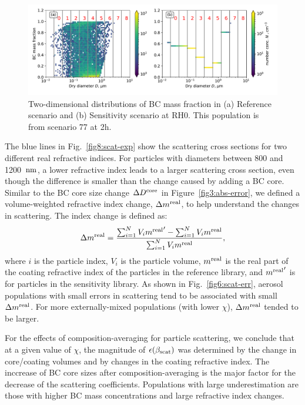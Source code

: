 \documentclass[edeposit,fullpage]{uiucthesis2009}
\makeatletter
\DeclareRobustCommand*\unit[1]
 {\ensuremath{%
   {\thinmuskip3mu\relax
    \def\mu{\text{\textmu}}\def~{\,}%
    \ifx\f@series\testbx\mathbf{#1}\else\mathrm{#1}\fi}}}
\makeatother
\begin{document}
\begin{figure}[H]
	\centering
	\includegraphics[scale=0.50]{chap4_figs/fig_sup3.pdf}
	\caption{Two-dimensional distributions of BC mass fraction in (a) Reference scenario and (b) Sensitivity scenario at RH0. 
	 This population is from scenario 77 at 2h.}
	\label{fig_sup3}
\end{figure}

The blue lines in Fig.~\ref{fig8:scat-exp} show the scattering cross
sections for two different real refractive indices. For particles with
diameters between 800 and 1200~\unit{nm}, a lower refractive index
leads to a larger scattering cross section, even though the difference
is smaller than the change caused by adding a BC core. Similar to the
BC core size change $\Delta D^{\rm core}$ {in
  Figure~\ref{fig3:abs-error}}, we defined a volume-weighted
refractive index change, $\Delta{m^{\rm real}}$, to help understand
the changes in scattering. The index change is defined as:
\begin{equation}
    \displaystyle \Delta{m^{\rm real}}=\frac{\sum_{i=1}^{N} V_i {m^{\rm real}}' - \sum_{i=1}^{N} V_i {m^{\rm real}}}{\sum_{i=1}^{N} V_i {m^{\rm real}}},
\end{equation}
where $i$ is the particle index, $V_i$ is the particle volume,
${m^{\rm real}}$ is the real part of the coating refractive index of
the particles in the reference library, and ${m^{\rm real}}'$ is for
particles in the sensitivity library. As shown in
Fig.~\ref{fig6:scat-err}, aerosol populations with small errors in
scattering tend to be associated with small $\Delta{m^{\rm
    real}}$. For more externally-mixed populations (with lower
$\chi$), $\Delta{m^{\rm real}}$ tended to be larger.

For the effects of composition-averaging for particle scattering, we
conclude that at a given value of $\chi$, the magnitude of
$\epsilon(\beta_{\rm scat})$ was determined by the change in
core/coating volumes and by changes in the coating refractive
index. The inccrease of BC core sizes after composition-averaging is
the major factor for the decrease of the scattering
coefficients. Populations with large underestimation are those with
higher BC mass concentrations and large refractive index changes.
\end{document}
